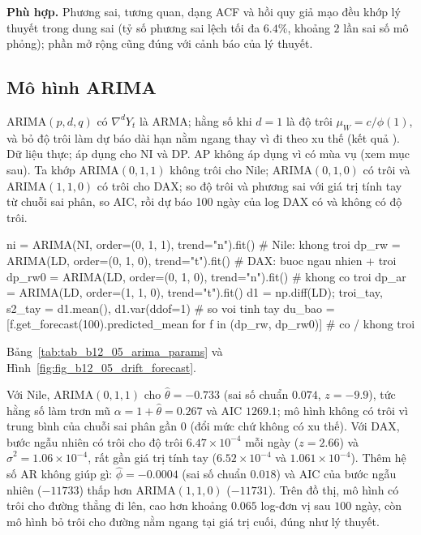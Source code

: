  \textbf{Phù hợp.} Phương sai, tương quan, dạng ACF và hồi quy giả mạo đều khớp lý thuyết trong dung sai (tỷ số phương sai lệch tối đa $6.4\%$, khoảng $2$ lần sai số mô phỏng); phần mở rộng cũng đúng với cảnh báo của lý thuyết.

\subsection{Mô hình ARIMA}

 ARIMA$(p,d,q)$ có $\nabla^dY_t$ là ARMA; hằng số khi $d=1$ là độ trôi $\mu_W=c/\phi(1)$, và bỏ độ trôi làm dự báo dài hạn nằm ngang thay vì đi theo xu thế (kết quả ).
 Dữ liệu thực; áp dụng cho NI và DP. AP không áp dụng vì có mùa vụ (xem mục sau). Ta khớp ARIMA$(0,1,1)$ không trôi cho Nile; ARIMA$(0,1,0)$ có trôi và ARIMA$(1,1,0)$ có trôi cho DAX; so độ trôi và phương sai với giá trị tính tay từ chuỗi sai phân, so AIC, rồi dự báo 100 ngày của log DAX có và không có độ trôi.
\begin{codeblock}
ni = ARIMA(NI, order=(0, 1, 1), trend="n").fit()               # Nile: khong troi
dp_rw = ARIMA(LD, order=(0, 1, 0), trend="t").fit()            # DAX: buoc ngau nhien + troi
dp_rw0 = ARIMA(LD, order=(0, 1, 0), trend="n").fit()           # khong co troi
dp_ar = ARIMA(LD, order=(1, 1, 0), trend="t").fit()
d1 = np.diff(LD); troi_tay, s2_tay = d1.mean(), d1.var(ddof=1) # so voi tinh tay
du_bao = [f.get_forecast(100).predicted_mean for f in (dp_rw, dp_rw0)]   # co / khong troi
\end{codeblock}
 Bảng~\ref{tab:tab_b12_05_arima_params} và Hình~\ref{fig:fig_b12_05_drift_forecast}.

 Với Nile, ARIMA$(0,1,1)$ cho $\hat\theta=-0.733$ (sai số chuẩn $0.074$, $z=-9.9$), tức hằng số làm trơn mũ $\alpha=1+\hat\theta=0.267$ và AIC $1269.1$; mô hình không có trôi vì trung bình của chuỗi sai phân gần $0$ (đổi mức chứ không có xu thế). Với DAX, bước ngẫu nhiên có trôi cho độ trôi $6.47\times10^{-4}$ mỗi ngày ($z=2.66$) và $\hat\sigma^2=1.06\times10^{-4}$, rất gần giá trị tính tay ($6.52\times10^{-4}$ và $1.061\times10^{-4}$). Thêm hệ số AR không giúp gì: $\hat\phi=-0.0004$ (sai số chuẩn $0.018$) và AIC của bước ngẫu nhiên ($-11733$) thấp hơn ARIMA$(1,1,0)$ ($-11731$). Trên đồ thị, mô hình có trôi cho đường thẳng đi lên, cao hơn khoảng $0.065$ log-đơn vị sau $100$ ngày, còn mô hình bỏ trôi cho đường nằm ngang tại giá trị cuối, đúng như lý thuyết.


